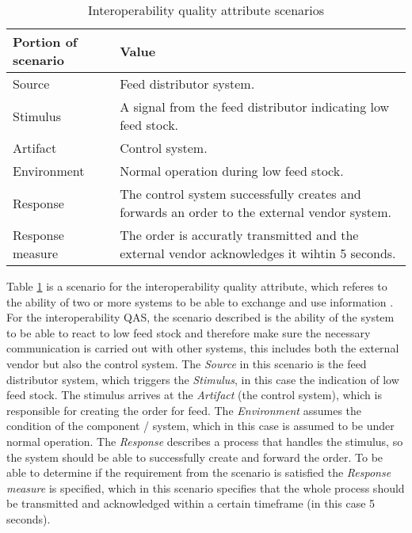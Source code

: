 \begin{table}[h]
    \renewcommand{\arraystretch}{1.3}
    \caption{Interoperability quality attribute scenarios}
    \label{interoperability}
    \centering
    \begin{tabularx}{\columnwidth}{>{\hsize=0.3\hsize}X>{\hsize=0.7\hsize}X}
        \hline
        \textbf{Portion of scenario} & \textbf{Value}                                                                               \\
        \hline
        Source                       & Feed distributor system.                                                                     \\
        Stimulus                     & A signal from the feed distributor indicating low feed stock.                                \\
        Artifact                     & Control system.                                                                              \\
        Environment                  & Normal operation during low feed stock.                                                      \\
        Response                     & The control system successfully creates and forwards an order to the external vendor system. \\
        Response measure             & The order is accuratly transmitted and the external vendor acknowledges it wihtin 5 seconds. \\
        \hline
    \end{tabularx}
\end{table}

Table \ref{interoperability} is a scenario for the interoperability quality attribute, which referes to the ability of two or more systems to be able to exchange and use information \cite{brownsword_2004}.
For the interoperability QAS, the scenario described is the ability of the system to be able to react to low feed stock and therefore make sure the necessary communication is carried out with other systems, this includes both the external vendor but also the control system.
The \textit{Source} in this scenario is the feed distributor system, which triggers the \textit{Stimulus}, in this case the indication of low feed stock. The stimulus arrives at the \textit{Artifact} (the control system), which is responsible for creating the order for feed. The \textit{Environment} assumes the condition of the component / system, which in this case is assumed to be under normal operation.
The \textit{Response} describes a process that handles the stimulus, so the system should be able to successfully create and forward the order. To be able to determine if the requirement from the scenario is satisfied the \textit{Response measure} is specified, which in this scenario specifies that the whole process should be transmitted and acknowledged within a certain timeframe (in this case 5 seconds). \newline

